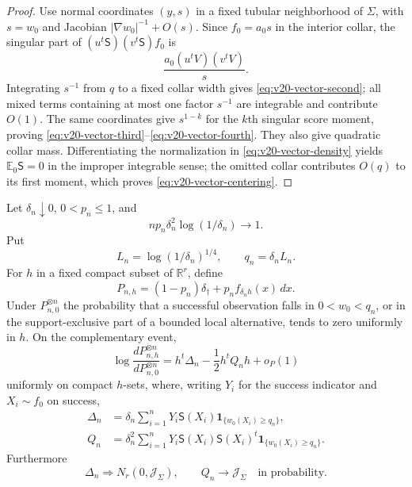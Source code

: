\begin{proof}
Use normal coordinates $(y,s)$ in a fixed tubular neighborhood of
$\Sigma$, with $s=w_0$ and Jacobian
$|\nabla w_0|^{-1}+O(s)$.  Since $f_0=a_0s$ in the interior collar, the
singular part of
$(u^t\mathsf S)(v^t\mathsf S)f_0$ is
\[
 \frac{a_0(u^tV)(v^tV)}s.
\]
Integrating $s^{-1}$ from $q$ to a fixed collar width gives
\eqref{eq:v20-vector-second}; all mixed terms containing at most one factor
$s^{-1}$ are integrable and contribute $O(1)$.  The same coordinates give
$s^{1-k}$ for the $k$th singular score moment, proving
\eqref{eq:v20-vector-third}--\eqref{eq:v20-vector-fourth}.  They also give
quadratic collar mass.  Differentiating the normalization in
\eqref{eq:v20-vector-density} yields $\mathbb E_0\mathsf S=0$ in the
improper integrable sense; the omitted collar contributes $O(q)$ to its
first moment, which proves \eqref{eq:v20-vector-centering}.
\end{proof}

\begin{lemma}
\label{lem:v20-vector-likelihood}
Let $\delta_n\downarrow0$, $0<p_n\le1$, and
\begin{equation}\label{eq:v20-vector-rate}
 n p_n\delta_n^2\log(1/\delta_n)\longrightarrow1.
\end{equation}
Put
\[
 L_n=\log(1/\delta_n)^{1/4},\qquad q_n=\delta_nL_n.
\]
For $h$ in a fixed compact subset of $\mathbb R^r$, define
\[
 P_{n,h}=(1-p_n)\delta_\dagger+p_nf_{\delta_nh}(x)\,dx.
\]
Under $P_{n,0}^{\otimes n}$ the probability that a successful observation
falls in $0<w_0<q_n$, or in the support-exclusive part of a bounded local
alternative, tends to zero uniformly in $h$.  On the complementary event,
\begin{equation}\label{eq:v20-vector-uniform-expansion}
 \log\frac{dP_{n,h}^{\otimes n}}{dP_{n,0}^{\otimes n}}
 =h^t\Delta_n-\frac12h^tQ_nh+o_P(1)
\end{equation}
uniformly on compact $h$-sets, where, writing $Y_i$ for the success
indicator and $X_i\sim f_0$ on success,
\begin{align}
 \Delta_n&=\delta_n\sum_{i=1}^nY_i
 \mathsf S(X_i)\mathbf 1_{\{w_0(X_i)\ge q_n\}},
                                                  \label{eq:v20-delta}\\
 Q_n&=\delta_n^2\sum_{i=1}^nY_i
 \mathsf S(X_i)\mathsf S(X_i)^t
 \mathbf 1_{\{w_0(X_i)\ge q_n\}}. \label{eq:v20-Q}
\end{align}
Furthermore
\begin{equation}\label{eq:v20-central-limits}
 \Delta_n\Rightarrow N_r(0,\mathcal J_\Sigma),
 \qquad Q_n\longrightarrow\mathcal J_\Sigma
 \quad\text{in probability}.
\end{equation}
\end{lemma}

